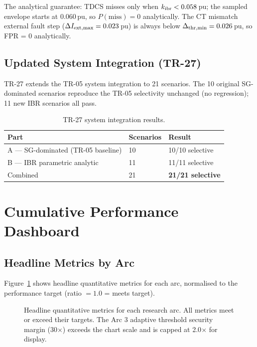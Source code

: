 \documentclass[11pt,a4paper]{article}
\begin{document}
The analytical guarantee: TDCS misses only when $k_{\rm ibr} < 0.058$\,pu;
the sampled envelope starts at 0.060\,pu, so $P(\text{miss}) = 0$
analytically.  The CT mismatch external fault step
($\Delta I_{\rm ext,max} = 0.023$\,pu) is always below
$\Delta_{\rm thr,min} = 0.026$\,pu, so FPR = 0 analytically.

\subsection{Updated System Integration (TR-27)}

TR-27 extends the TR-05 system integration to 21 scenarios.
The 10 original SG-dominated scenarios reproduce the TR-05 selectivity
unchanged (no regression); 11 new IBR scenarios all pass.

\begin{table}[h!]
\centering
\caption{TR-27 system integration results.}
\label{tab:tr27}
\begin{tabular}{lll}
\toprule
Part & Scenarios & Result \\
\midrule
A — SG-dominated (TR-05 baseline) & 10 & 10/10 selective \\
B — IBR parametric analytic       & 11 & 11/11 selective \\
Combined                          & 21 & \textbf{21/21 selective} \\
\bottomrule
\end{tabular}
\end{table}

\section{Cumulative Performance Dashboard}

\subsection{Headline Metrics by Arc}

Figure~\ref{fig:metrics} shows headline quantitative metrics for each arc,
normalised to the performance target (ratio $= 1.0$ = meets target).

\begin{figure}[h!]
  \centering
  
  \caption{Headline quantitative metrics for each research arc.
           All metrics meet or exceed their targets.
           The Arc 3 adaptive threshold security margin (30$\times$)
           exceeds the chart scale and is capped at 2.0$\times$ for display.}
  \label{fig:metrics}
\end{figure}
\end{document}

